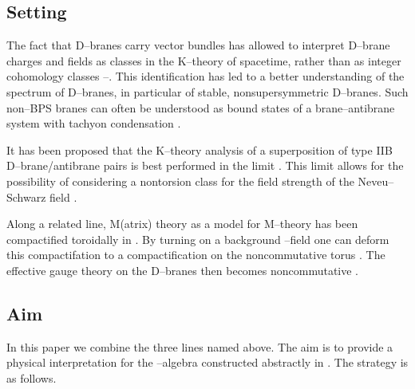 \documentclass[a4paper,a4paper]{article}
\begin{document}
\subsection{Setting}\label{set}  
  
The fact that D--branes carry vector bundles has allowed to  
interpret D--brane  charges and fields as classes in the K--theory
of spacetime, rather than as integer cohomology classes 
\cite{MINASIANMOORE}--\cite{MALDAMOOSEI}. This identification  
has led  to a better understanding of the spectrum of D--branes, 
in particular of  stable, nonsupersymmetric D--branes. Such non--BPS  
branes can often be  understood as bound states of a  
brane--antibrane system with tachyon condensation \cite{SEN}. 
 
It has been proposed \cite{WITMICHIGAN, BOUWMATHAI} that the K--theory 
analysis of a superposition of \coordHE{} type IIB D\coordHE{}--brane/antibrane pairs 
is best performed in the limit \coordHE{}. This limit allows 
for the possibility of considering a nontorsion class for the field strength 
\coordHE{} of the Neveu--Schwarz field \coordHE{}.   
  
Along a related line, M(atrix) theory \cite{MATRIX, JAP}  
as a model for M--theory has been compactified toroidally in  
\cite{TAYLOR}. By turning on a background \coordHE{}--field one can deform 
this compactifation to a compactification on the noncommutative 
torus \cite{CDS, HULL}. The effective gauge theory on the D--branes
then becomes noncommutative \cite{SWn}.   
  
\subsection{Aim}\label{aim}  
  
In this paper we combine the three lines named above. The aim is to provide 
a physical interpretation for the \coordHE{}--algebra 
constructed abstractly in \cite{PROCEEDINGS}. The strategy is as follows.
\end{document}
